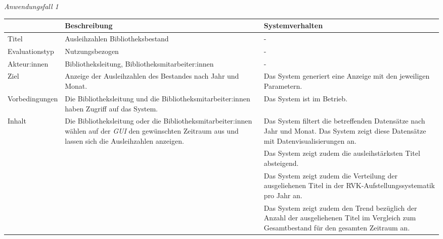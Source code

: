 \noindent
\textit{Anwendungsfall 1}
\begingroup
\setlength{\tabcolsep}{10pt} %
\renewcommand{\arraystretch}{1.25} 
\begin{table}[h]
    \centering
    \begin{adjustbox}{max width=\textwidth}
    \begin{tabular}{lp{7.5cm}p{7.5cm}}
       \toprule
       \textbf{}          & \textbf{Beschreibung} &\textbf{Systemverhalten}\\
       \midrule
        Titel                            &Ausleihzahlen Bibliotheksbestand  & -\\
        Evaluationstyp                   &Nutzungsbezogen                   & -\\
        Akteur:innen                      &Bibliotheksleitung, Bibliotheksmitarbeiter:innen & -\\
        Ziel                             &Anzeige der Ausleihzahlen des Bestandes nach Jahr und Monat. & Das System generiert eine Anzeige mit den jeweiligen Parametern.\\
        Vorbedingungen                   &Die Bibliotheksleitung und die Bibliotheksmitarbeiter:innen haben Zugriff auf das System. & Das System ist im Betrieb.\\
        Inhalt                           &Die Bibliotheksleitung oder die Bibliotheksmitarbeiter:innen wählen auf der \textit{\acrshort{GUI}} den gewünschten Zeitraum aus und lassen sich die Ausleihzahlen anzeigen. & Das System filtert die betreffenden Datensätze nach Jahr und Monat. Das System zeigt diese Datensätze mit Datenvisualisierungen an.\\
                                         & &Das System zeigt zudem die ausleihstärksten Titel absteigend.\\
                                         & &Das System zeigt zudem die Verteilung der ausgeliehenen Titel in der RVK-Aufstellungssystematik pro Jahr an.\\
                                         & &Das System zeigt zudem den Trend bezüglich der Anzahl der ausgeliehenen Titel im Vergleich zum Gesamtbestand für den gesamten Zeitraum an.\\

\end{tabular}
\end{adjustbox}
\end{table}
